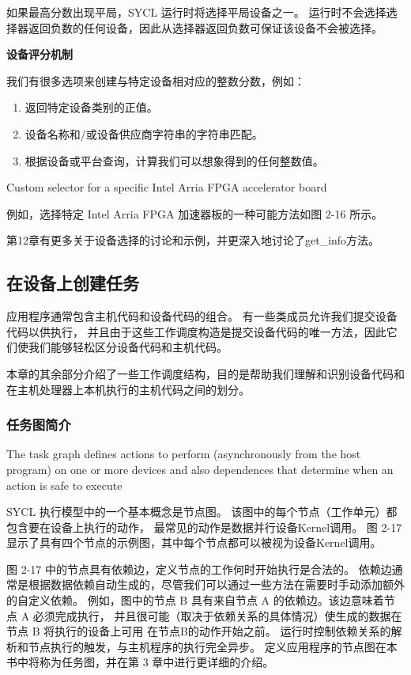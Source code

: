 如果最高分数出现平局，SYCL 运行时将选择平局设备之一。 
运行时不会选择选择器返回负数的任何设备，因此从选择器返回负数可保证该设备不会被选择。

\textbf{设备评分机制}

我们有很多选项来创建与特定设备相对应的整数分数，例如：

\begin{enumerate}
	\item 返回特定设备类别的正值。

	\item 设备名称和/或设备供应商字符串的字符串匹配。

	\item 根据设备或平台查询，计算我们可以想象得到的任何整数值。
\end{enumerate}

{\color{red} Custom selector for a specific Intel Arria FPGA accelerator board }

例如，选择特定 Intel Arria FPGA 加速器板的一种可能方法如图 2-16 所示。

第12章有更多关于设备选择的讨论和示例，并更深入地讨论了get\_info方法。

\subsection{在设备上创建任务}
应用程序通常包含主机代码和设备代码的组合。 有一些类成员允许我们提交设备代码以供执行，
并且由于这些工作调度构造是提交设备代码的唯一方法，因此它们使我们能够轻松区分设备代码和主机代码。

本章的其余部分介绍了一些工作调度结构，目的是帮助我们理解和识别设备代码和在主机处理器上本机执行的主机代码之间的划分。

\subsubsection{任务图简介}
{\color{red} The task graph defines actions to perform (asynchronously from the host program) on one or more devices and also dependences that determine when an action is safe to execute}

SYCL 执行模型中的一个基本概念是节点图。 该图中的每个节点（工作单元）都包含要在设备上执行的动作，
最常见的动作是数据并行设备Kernel调用。 图 2-17 显示了具有四个节点的示例图，其中每个节点都可以被视为设备Kernel调用。

图 2-17 中的节点具有依赖边，定义节点的工作何时开始执行是合法的。 
依赖边通常是根据数据依赖自动生成的，尽管我们可以通过一些方法在需要时手动添加额外的自定义依赖。 
例如，图中的节点 B 具有来自节点 A 的依赖边。该边意味着节点 A 必须完成执行，
并且很可能（取决于依赖关系的具体情况）使生成的数据在节点 B 将执行的设备上可用 在节点B的动作开始之前。 
运行时控制依赖关系的解析和节点执行的触发，与主机程序的执行完全异步。 
定义应用程序的节点图在本书中将称为任务图，并在第 3 章中进行更详细的介绍。

